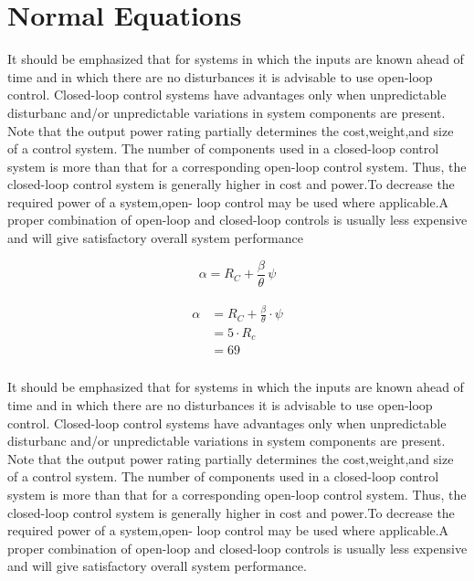 \documentclass{report}
\begin{document}
\chapter{Normal Equations}

It should be emphasized that for systems in which the inputs are known ahead of time and in which there are no disturbances it is advisable to use open-loop control.  Closed-loop control systems have advantages only when unpredictable disturbanc and/or unpredictable variations in system components are present. Note that the  output power rating partially determines the cost,weight,and size of a control system.  The number of components used in a closed-loop control system is more than that for  a corresponding open-loop control system. Thus, the closed-loop control system is  generally higher in cost and power.To decrease the required power of a system,open-  loop control may be used where applicable.A proper combination of open-loop and  closed-loop controls is usually less expensive and will give satisfactory overall system  performance

\begin{equation}
\alpha=R_{C} + \frac{\beta}{\theta} \, \psi
\end{equation}

\begin{align}
\begin{split}
\alpha &= R_{C} + \frac{\beta}{\theta} \cdot \psi\\
 &= 5 \cdot R_{c}\\
 &= 69\\
\end{split}
\end{align}

It should be emphasized that for systems in which the inputs are known ahead of time and in which there are no disturbances it is advisable to use open-loop control.  Closed-loop control systems have advantages only when unpredictable disturbanc and/or unpredictable variations in system components are present. Note that the  output power rating partially determines the cost,weight,and size of a control system.  The number of components used in a closed-loop control system is more than that for  a corresponding open-loop control system. Thus, the closed-loop control system is  generally higher in cost and power.To decrease the required power of a system,open-  loop control may be used where applicable.A proper combination of open-loop and  closed-loop controls is usually less expensive and will give satisfactory overall system  performance.
\end{document}
